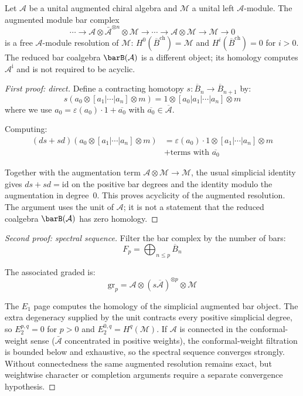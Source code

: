 \begin{theorem}\label{thm:bar-resolution-acyclic}
Let $\mathcal A$ be a unital augmented chiral algebra and
$\mathcal M$ a unital left $\mathcal A$-module. The augmented module
bar complex
\[
\cdots \to
\mathcal A\otimes\bar{\mathcal A}^{\otimes n}\otimes\mathcal M
\to \cdots \to
\mathcal A\otimes\mathcal M \to \mathcal M \to 0
\]
is a free $\mathcal A$-module resolution of $\mathcal M$:
$H^0(\overline{B}^{\text{ch}})=\mathcal M$ and
$H^i(\overline{B}^{\text{ch}})=0$ for $i>0$. The reduced bar
coalgebra $\barB(\mathcal A)$ is a different object; its homology
computes $\mathcal A^{\mathrm i}$ and is not required to be acyclic.
\end{theorem}

\begin{proof}[First proof: direct]
Define a contracting homotopy $s: \overline{B}_n \to \overline{B}_{n+1}$ by:
\[
s(a_0 \otimes [a_1|\cdots|a_n] \otimes m) = 1 \otimes [a_0|a_1|\cdots|a_n] \otimes m
\]
where we use $a_0 = \varepsilon(a_0) \cdot 1 + \overline{a_0}$ with $\overline{a_0} \in \overline{\mathcal{A}}$.

Computing:
\begin{align}
(ds + sd)(a_0 \otimes [a_1|\cdots|a_n] \otimes m) &= \varepsilon(a_0) \cdot 1 \otimes [a_1|\cdots|a_n] \otimes m \\
&+ \text{terms with } \overline{a_0}
\end{align}

Together with the augmentation term
$\mathcal A\otimes\mathcal M\to\mathcal M$, the usual simplicial
identity gives $ds+sd=\mathrm{id}$ on the positive bar degrees and
the identity modulo the augmentation in degree~$0$. This proves
acyclicity of the augmented resolution. The argument uses the unit of
$\mathcal A$; it is not a statement that the reduced coalgebra
$\barB(\mathcal A)$ has zero homology.
\end{proof}

\begin{proof}[Second proof: spectral sequence]
Filter the bar complex by the number of bars:
\[
F_p = \bigoplus_{n \leq p} \overline{B}_n
\]

The associated graded is:
\[
\text{gr}_p = \mathcal{A} \otimes (s\overline{\mathcal{A}})^{\otimes p} \otimes \mathcal{M}
\]

The $E_1$ page computes the homology of the simplicial augmented bar
object. The extra degeneracy supplied by the unit contracts every
positive simplicial degree, so $E_2^{p,q}=0$ for $p>0$ and
$E_2^{0,q}=H^q(\mathcal M)$. If $\mathcal A$ is connected in the
conformal-weight sense
\textup{(}$\bar{\mathcal A}$ concentrated in positive weights\textup{)},
the conformal-weight filtration is bounded below and exhaustive, so
the spectral sequence converges strongly. Without connectedness the
same augmented resolution remains exact, but weightwise character
or completion arguments require a separate convergence hypothesis.
\end{proof}

